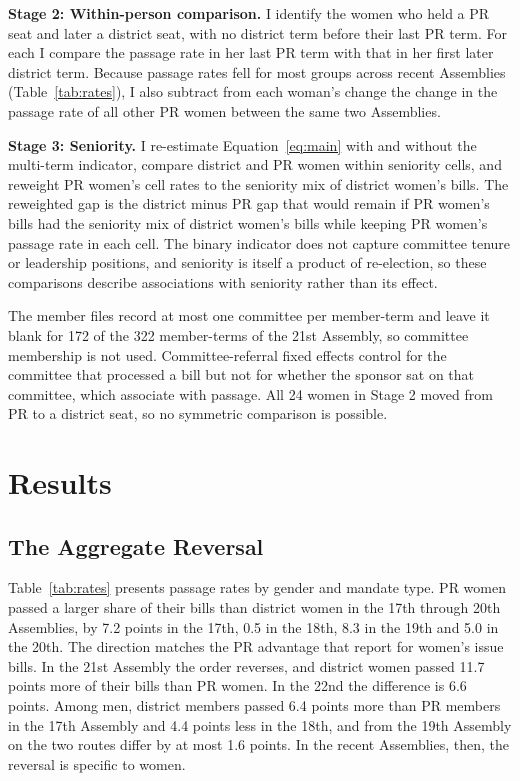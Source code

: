 \documentclass[11pt]{article}
\begin{document}
\textbf{Stage 2: Within-person comparison.} I identify the women who held a PR seat and later a district seat, with no district term before their last PR term. For each I compare the passage rate in her last PR term with that in her first later district term. Because passage rates fell for most groups across recent Assemblies (Table~\ref{tab:rates}), I also subtract from each woman's change the change in the passage rate of all other PR women between the same two Assemblies.

\textbf{Stage 3: Seniority.} I re-estimate Equation~\ref{eq:main} with and without the multi-term indicator, compare district and PR women within seniority cells, and reweight PR women's cell rates to the seniority mix of district women's bills. The reweighted gap is the district minus PR gap that would remain if PR women's bills had the seniority mix of district women's bills while keeping PR women's passage rate in each cell. The binary indicator does not capture committee tenure or leadership positions, and seniority is itself a product of re-election, so these comparisons describe associations with seniority rather than its effect.

The member files record at most one committee per member-term and leave it blank for 172 of the 322 member-terms of the 21st Assembly, so committee membership is not used. Committee-referral fixed effects control for the committee that processed a bill but not for whether the sponsor sat on that committee, which \citet{an2025} associate with passage. All 24 women in Stage 2 moved from PR to a district seat, so no symmetric comparison is possible.


\section{Results}

\subsection{The Aggregate Reversal}

Table~\ref{tab:rates} presents passage rates by gender and mandate type. PR women passed a larger share of their bills than district women in the 17th through 20th Assemblies, by 7.2 points in the 17th, 0.5 in the 18th, 8.3 in the 19th and 5.0 in the 20th. The direction matches the PR advantage that \citet{kweon2021} report for women's issue bills. In the 21st Assembly the order reverses, and district women passed 11.7 points more of their bills than PR women. In the 22nd the difference is 6.6 points. Among men, district members passed 6.4 points more than PR members in the 17th Assembly and 4.4 points less in the 18th, and from the 19th Assembly on the two routes differ by at most 1.6 points. In the recent Assemblies, then, the reversal is specific to women.
\end{document}
